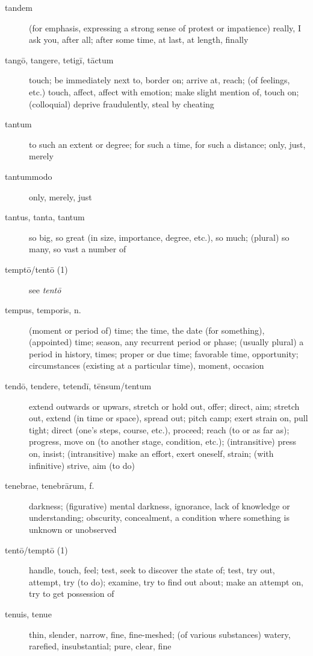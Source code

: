 \begin{description}
    \item[tandem] \marginnote{*}(for emphasis, expressing a strong sense of protest or impatience) really, I ask you, after all; after some time, at last, at length, finally
    \item[tangō, tangere, tetigī, tāctum] \marginnote{*}touch; be immediately next to, border on; arrive at, reach; (of feelings, etc.) touch, affect, affect with emotion; make slight mention of, touch on; (colloquial) deprive fraudulently, steal by cheating
    \item[tantum] \marginnote{*}to such an extent or degree; for such a time, for such a distance; only, just, merely
    \item[tantummodo] \marginnote{*}only, merely, just
    \item[tantus, tanta, tantum] \marginnote{*}so big, so great (in size, importance, degree, etc.), so much; (plural) so many, so vast a number of
    \item[temptō/tentō (1)] see \textit{tentō}
    \item[tempus, temporis, n.] \marginnote{*}(moment or period of) time; the time, the date (for something), (appointed) time; season, any recurrent period or phase; (usually plural) a period in history, times; proper or due time; favorable time, opportunity; circumstances (existing at a particular time), moment, occasion
    \item[tendō, tendere, tetendī, tēnsum/tentum] \marginnote{*}extend outwards or upwars, stretch or hold out, offer; direct, aim; stretch out, extend (in time or space), spread out; pitch camp; exert strain on, pull tight; direct (one's steps, course, etc.), proceed; reach (to or as far as); progress, move on (to another stage, condition, etc.); (intransitive) press on, insist; (intransitive) make an effort, exert oneself, strain; (with infinitive) strive, aim (to do)
    \item[tenebrae, tenebrārum, f.] \marginnote{*}darkness; (figurative) mental darkness, ignorance, lack of knowledge or understanding; obscurity, concealment, a condition where something is unknown or unobserved
    \item[tentō/temptō (1)] \marginnote{*}handle, touch, feel; test, seek to discover the state of; test, try out, attempt, try (to do); examine, try to find out about; make an attempt on, try to get possession of
    \item[tenuis, tenue] thin, slender, narrow, fine, fine-meshed; (of various substances) watery, rarefied, insubstantial; pure, clear, fine

\end{description}

